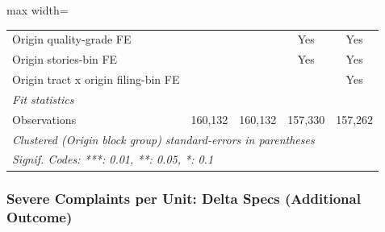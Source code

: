 \documentclass[
  11pt,
]{article}
\begin{document}
\begin{adjustbox}{max width=\textwidth}
\begin{tabular}{lcccc}
   Origin quality-grade FE                         &                &                & Yes             & Yes\\  
   Origin stories-bin FE                           &                &                & Yes             & Yes\\  
   Origin tract x origin filing-bin FE             &                &                &                 & Yes\\  
   \midrule
   \emph{Fit statistics}\\
   Observations                                    & 160,132        & 160,132        & 157,330         & 157,262\\  
   \midrule \midrule
   \multicolumn{5}{l}{\emph{Clustered (Origin block group) standard-errors in parentheses}}\\
   \multicolumn{5}{l}{\emph{Signif. Codes: ***: 0.01, **: 0.05, *: 0.1}}\\
\end{tabular}
\par\endgroup

\end{adjustbox}

\subsubsection{Severe Complaints per Unit: Delta Specs (Additional
Outcome)}\label{severe-complaints-per-unit-delta-specs-additional-outcome}
\end{document}
